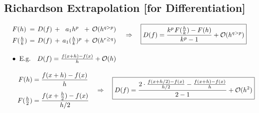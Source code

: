 \documentclass[12pt]{article}
\newcommand{\hs}{\hspace{1pt}}
\begin{document}
\vspace{10pt}
\subsection{Richardson Extrapolation [for Differentiation]}

\vspace{5pt}
\(\hspace{10pt}
    \begin{aligned}
        &\arraycolsep=2pt \begin{array}{l c c c c c c}
                F(h) &= 
                    &D(f) 
                    &+ 
                    &a_1 h^p 
                    &+ 
                    &\mathcal{O}(h^{q > p})
                    \\[5pt]
                F(\tfrac{h}{k}) &=   
                    &D(f) 
                    &+ 
                    &a_1 ( \tfrac{h}{k} )^p 
                    &+ 
                    &\mathcal{O}(h^{r \geq q})
            \end{array}
            \hspace{10pt} \Rightarrow \hspace{10pt}
            \boxed{ D(f) = \frac{ k^{p} \hs F( \tfrac{h}{k} ) - F(h) }{ k^{p} - 1 } + \mathcal{O}(h^{q>p}) }
            \\[10pt]
        &\bullet\ \text{E.g.} \hspace{10pt} D(f) = \tfrac{f(x+h) - f(x)}{h} + \mathcal{O}(h)
            \\[10pt]
        &\hspace{10pt}\begin{aligned}
                F(h) &= \frac{f(x+h) - f(x)}{h}\\[5pt]
                F(\tfrac{h}{2}) &= \frac{f(x + \tfrac{h}{2}) - f(x)}{h/2}
            \end{aligned}
            \hspace{10pt} \Rightarrow \hspace{10pt}
            \boxed{ 
                D(f) = \frac{ 
                    2 \cdot \tfrac{f(x + h/2) - f(x)}{h/2} 
                    - \tfrac{f(x+h) - f(x)}{h}
                }{ 2-1 }
                + \mathcal{O}(h^2)
            }
    \end{aligned}
\)
\end{document}
